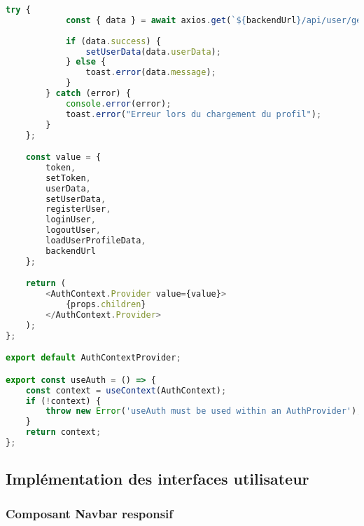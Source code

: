 \begin{lstlisting}[language=JavaScript, caption=AuthContext.jsx]
        try {
            const { data } = await axios.get(`${backendUrl}/api/user/get-profile`);
            
            if (data.success) {
                setUserData(data.userData);
            } else {
                toast.error(data.message);
            }
        } catch (error) {
            console.error(error);
            toast.error("Erreur lors du chargement du profil");
        }
    };

    const value = {
        token,
        setToken,
        userData,
        setUserData,
        registerUser,
        loginUser,
        logoutUser,
        loadUserProfileData,
        backendUrl
    };

    return (
        <AuthContext.Provider value={value}>
            {props.children}
        </AuthContext.Provider>
    );
};

export default AuthContextProvider;

export const useAuth = () => {
    const context = useContext(AuthContext);
    if (!context) {
        throw new Error('useAuth must be used within an AuthProvider');
    }
    return context;
};
\end{lstlisting}

\subsection{Implémentation des interfaces utilisateur}

\subsubsection{Composant Navbar responsif}

